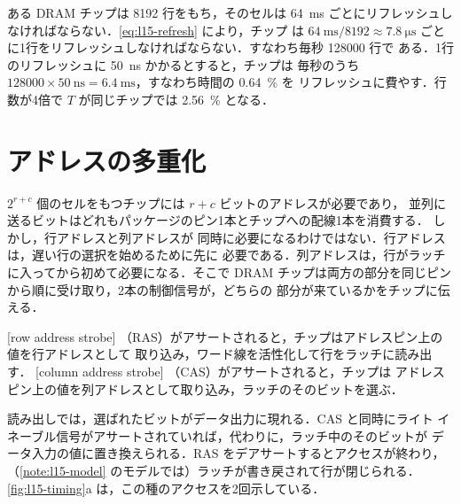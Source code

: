 \documentclass[../main.tex]{subfiles}
\begin{document}
\begin{example}
  \label{ex:l15-refresh}
  ある DRAM チップは \num{8192} 行をもち，そのセルは \SI{64}{\milli\second}
  ごとにリフレッシュしなければならない．\cref{eq:l15-refresh} により，チップ
  は $\SI{64}{\milli\second}/\num{8192} \approx \SI{7.8}{\micro\second}$
  ごとに1行をリフレッシュしなければならない．すなわち毎秒 \num{128000} 行で
  ある．1行のリフレッシュに \SI{50}{\nano\second} かかるとすると，チップは
  毎秒のうち $\num{128000} \times \SI{50}{\nano\second} =
  \SI{6.4}{\milli\second}$，すなわち時間の \SI{0.64}{\percent} を
  リフレッシュに費やす．行数が4倍で $T$ が同じチップでは
  \SI{2.56}{\percent} となる．
\end{example}

\section{アドレスの多重化}
\label{sec:l15-ras-cas}

$2^{r+c}$ 個のセルをもつチップには $r+c$ ビットのアドレスが必要であり，
並列に送るビットはどれもパッケージのピン1本とチップへの配線1本を消費する．
しかし，行アドレスと列アドレスが
同時に必要になるわけではない．行アドレスは，遅い行の選択を始めるために先に
必要である．列アドレスは，行がラッチに入ってから初めて必要になる．そこで
DRAM チップは両方の部分を同じピンから順に受け取り，2本の制御信号が，どちらの
部分が来ているかをチップに伝える．

\begin{definition}
  [row address strobe]%
  （RAS）がアサートされると，チップはアドレスピン上の値を行アドレスとして
  取り込み，ワード線を活性化して行をラッチに読み出す．
  [column address strobe]%
  （CAS）がアサートされると，チップは
  アドレスピン上の値を列アドレスとして取り込み，ラッチのそのビットを選ぶ．
\end{definition}

読み出しでは，選ばれたビットがデータ出力に現れる．CAS と同時にライト
イネーブル信号がアサートされていれば，代わりに，ラッチ中のそのビットが
データ入力の値に置き換えられる．RAS をデアサートするとアクセスが終わり，
（\cref{note:l15-model} のモデルでは）ラッチが書き戻されて行が閉じられる．
\cref{fig:l15-timing}a は，この種のアクセスを2回示している．
\end{document}

